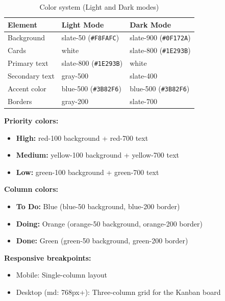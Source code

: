 \documentclass[12pt, a4paper]{article}
\begin{document}
\begin{table}[H]
\centering
\begin{tabularx}{0.9\textwidth}{lXX}
\toprule
\textbf{Element} & \textbf{Light Mode} & \textbf{Dark Mode} \\
\midrule
Background     & slate-50 (\texttt{\#F8FAFC})   & slate-900 (\texttt{\#0F172A}) \\
Cards          & white                           & slate-800 (\texttt{\#1E293B}) \\
Primary text   & slate-800 (\texttt{\#1E293B})   & white \\
Secondary text & gray-500                        & slate-400 \\
Accent color   & blue-500 (\texttt{\#3B82F6})    & blue-500 (\texttt{\#3B82F6}) \\
Borders        & gray-200                        & slate-700 \\
\bottomrule
\end{tabularx}
\caption{Color system (Light and Dark modes)}
\end{table}

\textbf{Priority colors:}
\begin{itemize}[nosep]
    \item \textcolor{redpriority}{\textbf{High:}} red-100 background + red-700 text
    \item \textcolor{yellowpriority}{\textbf{Medium:}} yellow-100 background + yellow-700 text
    \item \textcolor{greenpriority}{\textbf{Low:}} green-100 background + green-700 text
\end{itemize}

\textbf{Column colors:}
\begin{itemize}[nosep]
    \item \textbf{To Do:} Blue (blue-50 background, blue-200 border)
    \item \textbf{Doing:} Orange (orange-50 background, orange-200 border)
    \item \textbf{Done:} Green (green-50 background, green-200 border)
\end{itemize}

\textbf{Responsive breakpoints:}
\begin{itemize}[nosep]
    \item Mobile: Single-column layout
    \item Desktop (md: 768px+): Three-column grid for the Kanban board
\end{itemize}
\end{document}
